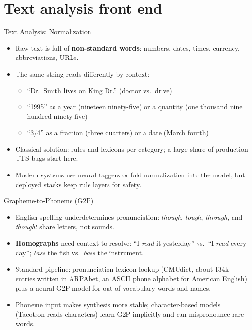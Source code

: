 \section{Text analysis front end}

\begin{frame}{Text Analysis: Normalization}
  \begin{itemize}
    \item Raw text is full of \textbf{non-standard words}: numbers, dates, times, currency, abbreviations, URLs.
    \item The same string reads differently by context:
      \begin{itemize}
        \item ``Dr.\ Smith lives on King Dr.'' (doctor vs.\ drive)
        \item ``1995'' as a year (nineteen ninety-five) or a quantity (one thousand nine hundred ninety-five)
        \item ``3/4'' as a fraction (three quarters) or a date (March fourth)
      \end{itemize}
    \item Classical solution: rules and lexicons per category; a large share of production TTS bugs start here.
    \item Modern systems use neural taggers or fold normalization into the model, but deployed stacks keep rule layers for safety.
  \end{itemize}
\end{frame}

\begin{frame}{Grapheme-to-Phoneme (G2P)}
  \begin{itemize}
    \item English spelling underdetermines pronunciation: \textit{though}, \textit{tough}, \textit{through}, and \textit{thought} share letters, not sounds.
    \item \textbf{Homographs} need context to resolve: ``I \textit{read} it yesterday'' vs.\ ``I \textit{read} every day''; \textit{bass} the fish vs.\ \textit{bass} the instrument.
    \item Standard pipeline: pronunciation lexicon lookup (CMUdict, about 134k entries written in ARPAbet, an ASCII phone alphabet for American English) plus a neural G2P model for out-of-vocabulary words and names.
    \item Phoneme input makes synthesis more stable; character-based models (Tacotron reads characters) learn G2P implicitly and can mispronounce rare words.
  \end{itemize}
\end{frame}
